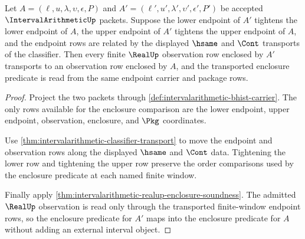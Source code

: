 \begin{theorem}
\label{thm:intervalarithmetic-monotone-enclosure-transport}
Let $A=(\ell,u,\lambda,\upsilon,\epsilon,P)$ and
$A'=(\ell',u',\lambda',\upsilon',\epsilon',P')$ be accepted
$\IntervalArithmeticUp$ packets. Suppose the lower endpoint of $A'$ tightens
the lower endpoint of $A$, the upper endpoint of $A'$ tightens the upper
endpoint of $A$, and the endpoint rows are related by the displayed
$\hsame$ and $\Cont$ transports of the classifier. Then every finite
$\RealUp$ observation row enclosed by $A'$ transports to an observation row
enclosed by $A$, and the transported enclosure predicate is read from the
same endpoint carrier and package rows.
\end{theorem}
\begin{proof}
Project the two packets through
\autoref{def:intervalarithmetic-bhist-carrier}. The only rows available for
the enclosure comparison are the lower endpoint, upper endpoint, observation,
enclosure, and $\Pkg$ coordinates.

Use \autoref{thm:intervalarithmetic-classifier-transport} to move the
endpoint and observation rows along the displayed $\hsame$ and $\Cont$
data. Tightening the lower row and tightening the upper row preserve the
order comparisons used by the enclosure predicate at each named finite
window.

Finally apply \autoref{thm:intervalarithmetic-realup-enclosure-soundness}.
The admitted $\RealUp$ observation is read only through the transported
finite-window endpoint rows, so the enclosure predicate for $A'$ maps into
the enclosure predicate for $A$ without adding an external interval object.
\end{proof}

